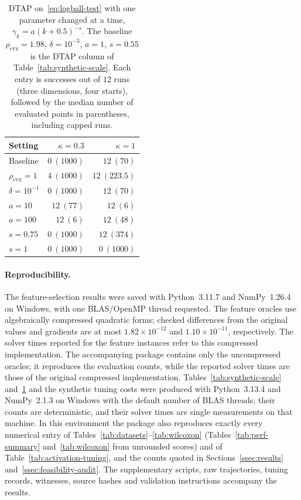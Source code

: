 \documentclass[]{interact}
\theoremstyle{plain}
\theoremstyle{definition}
\theoremstyle{remark}
\newcommand{\cvx}{\mathrm{cvx}}
\begin{document}
\begin{table}[t]
\centering\small
\setlength{\tabcolsep}{5pt}
\caption{DTAP on~\eqref{eq:logball-test} with one parameter changed at a time,
$\gamma_k=a(k+0.5)^{-s}$. The baseline $\rho_{\cvx}=1.98$, $\delta=10^{-3}$, $a=1$,
$s=0.55$ is the DTAP column of Table~\ref{tab:synthetic-scale}. Each entry is
successes out of $12$ runs (three dimensions, four starts), followed by the
median number of evaluated points in parentheses, including capped runs.}
\label{tab:dtap-sweep}
\begin{tabular}{@{}lrr@{}}
\toprule
Setting & $\kappa=0.3$ & $\kappa=1$\\
\midrule
Baseline & $0\ (1000)$ & $12\ (70)$\\
$\rho_{\cvx}=1$ & $4\ (1000)$ & $12\ (223.5)$\\
$\delta=10^{-1}$ & $0\ (1000)$ & $12\ (70)$\\
$a=10$ & $12\ (77)$ & $12\ (6)$\\
$a=100$ & $12\ (6)$ & $12\ (48)$\\
$s=0.75$ & $0\ (1000)$ & $12\ (374)$\\
$s=1$ & $0\ (1000)$ & $0\ (1000)$\\
\bottomrule
\end{tabular}
\end{table}

\paragraph*{Reproducibility.}
The feature-selection results were saved with Python~3.11.7 and NumPy~1.26.4
on Windows, with one BLAS/OpenMP thread requested. The feature oracles use algebraically
compressed quadratic forms; checked differences from the original
values and gradients are at most $1.82\times10^{-12}$ and
$1.10\times10^{-11}$, respectively. The solver times reported for the feature instances refer
to this compressed implementation. The accompanying package contains only the uncompressed
oracles; it reproduces the evaluation counts, while the reported solver times are those of
the original compressed implementation. Tables~\ref{tab:synthetic-scale}
and~\ref{tab:dtap-sweep} and the synthetic tuning costs were produced with
Python~3.13.4 and NumPy~2.1.3 on Windows with the default number of BLAS
threads; their counts are deterministic, and their solver times are single
measurements on that machine. In this environment the package also
reproduces exactly every numerical entry of Tables~\ref{tab:datasets}--\ref{tab:wilcoxon}
(Tables~\ref{tab:perf-summary} and~\ref{tab:wilcoxon} from unrounded scores) and of
Table~\ref{tab:activation-tuning}, and the counts quoted in Sections~\ref{ssec:results}
and~\ref{ssec:feasibility-audit}.
The supplementary scripts, raw trajectories, tuning records, witnesses,
source hashes and validation instructions accompany the results.
\end{document}
